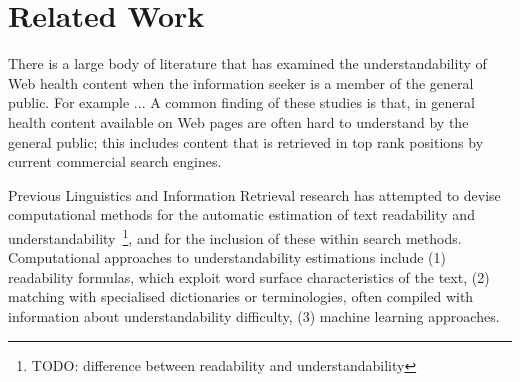 %
%

\section{Related Work}
\label{sec:related}
There is a large body of literature that has examined the understandability of Web health content when the information seeker is a member of the general public. For example ...
A common finding of these studies is that, in general health content available on Web pages are often hard to understand by the general public; this includes content that is retrieved in top rank positions by current commercial search engines.

Previous Linguistics and Information Retrieval research has attempted to devise computational methods for the automatic estimation of text readability and understandability~\footnote{TODO: difference between readability and understandability}, and for the inclusion of these within search methods. Computational approaches to understandability estimations include (1) readability formulas, which exploit word surface characteristics of the text, (2) matching with specialised dictionaries or terminologies, often compiled with information about understandability difficulty, (3) machine learning approaches.

